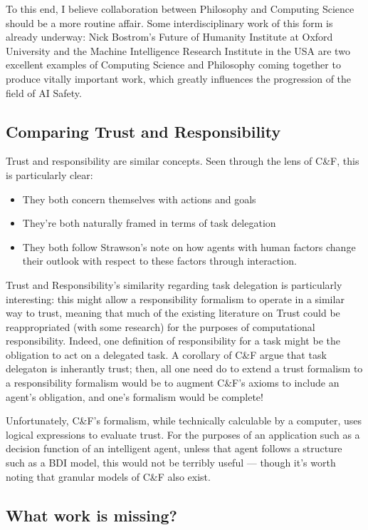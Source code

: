 To this end, I believe collaboration between Philosophy and Computing Science should be a more routine affair. Some interdisciplinary work of this form is already underway: Nick Bostrom's Future of Humanity Institute at Oxford University and the Machine Intelligence Research Institute in the USA are two excellent examples of Computing Science and Philosophy coming together to produce vitally important work, which greatly influences the progression of the field of AI Safety.\par


\subsection{Comparing Trust and Responsibility}
Trust and responsibility are similar concepts. Seen through the lens of C\&F, this is particularly clear: 

\begin{itemize}
    \item They both concern themselves with actions and goals
    \item They're both naturally framed in terms of task delegation
    \item They both follow Strawson's note on how agents with human factors change their outlook with respect to these factors through interaction.
\end{itemize}

Trust and Responsibility's similarity regarding task delegation is particularly interesting: this might allow a responsibility formalism to operate in a similar way to trust, meaning that much of the existing literature on Trust could be reappropriated (with some research) for the purposes of computational responsibility. Indeed, one definition of responsibility for a task might be the obligation to act on a delegated task. A corollary of C\&F argue that task delegaton is inherantly trust; then, all one need do to extend a trust formalism to a responsibility formalism would be to augment C\&F's axioms to include an agent's obligation, and one's formalism would be complete!\par

Unfortunately, C\&F's formalism, while technically calculable by a computer, uses logical expressions to evaluate trust. For the purposes of an application such as a decision function of an intelligent agent, unless that agent follows a structure such as a BDI model, this would not be terribly useful --- though it's worth noting that granular models of C\&F also exist\cite{}.



\subsection{What work is missing?}

